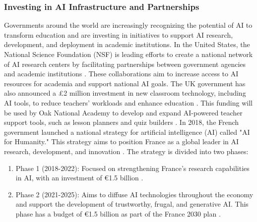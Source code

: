 \documentclass{article}
\begin{document}
\subsubsection{Investing in AI Infrastructure and Partnerships}
Governments around the world are increasingly recognizing the potential of AI to transform education and are investing in initiatives to support AI research, development, and deployment in academic institutions. In the United States, the National Science Foundation (NSF) is leading efforts to create a national network of AI research centers by facilitating partnerships between government agencies and academic institutions \cite{https://www2.datainnovation.org/2022-ai-universities.pdf}. These collaborations aim to increase access to AI resources for academia and support national AI goals.
The UK government has also announced a £2 million investment in new classroom technology, including AI tools, to reduce teachers' workloads and enhance education \cite{https://dig.watch/updates/uk-government-invests-2-million-in-ai-classroom-technology} \cite{https://www.openaccessgovernment.org/uk-government-invests-in-ai-powered-teacher-support/169271/}. This funding will be used by Oak National Academy to develop and expand AI-powered teacher support tools, such as lesson planners and quiz builders \cite{https://www.gov.uk/government/news/new-support-for-teachers-powered-by-artificial-intelligence} \cite{https://www.openaccessgovernment.org/uk-government-invests-in-ai-powered-teacher-support/169271/}.
In 2018, the French government launched a national strategy for artificial intelligence (AI) called "AI for Humanity." This strategy aims to position France as a global leader in AI research, development, and innovation \cite{https://www.economie.gouv.fr/strategie-nationale-intelligence-artificielle} \cite{https://www.entreprises.gouv.fr/fr/numerique/enjeux/la-strategie-nationale-pour-l-ia}. The strategy is divided into two phases:
\begin{enumerate}
    \item Phase 1 (2018-2022): Focused on strengthening France's research capabilities in AI, with an investment of €1.5 billion \cite{https://www.economie.gouv.fr/strategie-nationale-intelligence-artificielle} \cite{https://www.entreprises.gouv.fr/fr/numerique/enjeux/la-strategie-nationale-pour-l-ia} \cite{https://www.enseignementsup-recherche.gouv.fr/fr/la-strategie-france-ia-soutenir-la-dynamique-francaise-autour-de-l-intelligence-artificielle-46305}.
    \item Phase 2 (2021-2025): Aims to diffuse AI technologies throughout the economy and support the development of trustworthy, frugal, and generative AI. This phase has a budget of €1.5 billion as part of the France 2030 plan \cite{https://www.economie.gouv.fr/strategie-nationale-intelligence-artificielle} \cite{https://www.entreprises.gouv.fr/fr/numerique/enjeux/la-strategie-nationale-pour-l-ia}.
\end{enumerate}
\end{document}
